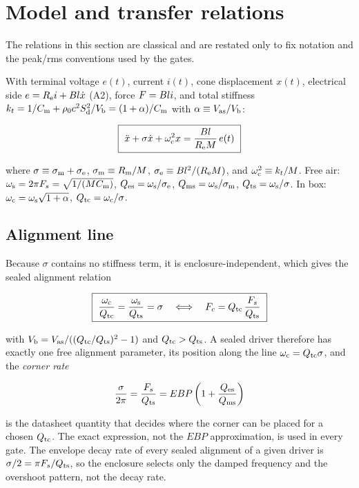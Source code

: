 \section{Model and transfer relations}
\label{sec:model}

The relations in this section are classical
\cite{small1972,small1972direct} and are restated only to fix notation and
the peak/rms conventions used by the gates.

With terminal voltage $e(t)$, current $i(t)$, cone displacement $x(t)$,
electrical side $e=R_{\mathrm{e}} i+Bl\dot x$ (A2), force $F=Bl i$, and total
stiffness $k_t=1/C_{\mathrm{m}}+\rho_0c^2S_{\mathrm{d}}^2/V_{\mathrm{b}}=(1+\alpha)/C_{\mathrm{m}}$ with
$\alpha\equiv V_{\mathrm{as}}/V_{\mathrm{b}}$:

\begin{equation}
	\boxed{\
		\ddot{x}+\sigma\dot{x}+\omega_{\mathrm{c}}^2 x = \frac{Bl}{R_{\mathrm{e}} M}\,e(t)\ }
	\label{eq:ode}
\end{equation}

where $\sigma\equiv\sigma_{\mathrm{m}}+\sigma_{\mathrm{e}}$, $\sigma_{\mathrm{m}}\equiv R_{\mathrm{m}}/M$,
$\sigma_{\mathrm{e}}\equiv Bl^2/(R_{\mathrm{e}}M)$, and $\omega_{\mathrm{c}}^2\equiv k_t/M$. Free air:
$\omega_{\mathrm{s}}=2\pi F_s=\sqrt{1/(MC_{\mathrm{m}})}$, $Q_{\mathrm{es}}=\omega_{\mathrm{s}}/\sigma_{\mathrm{e}}$, $Q_{\mathrm{ms}}=\omega_{\mathrm{s}}/\sigma_{\mathrm{m}}$,
$Q_{\mathrm{ts}}=\omega_{\mathrm{s}}/\sigma$. In box: $\omega_{\mathrm{c}}=\omega_{\mathrm{s}}\sqrt{1+\alpha}$, $Q_{\mathrm{tc}}=\omega_{\mathrm{c}}/\sigma$.

\subsection{Alignment line}
\label{sec:model-alignment}

Because $\sigma$ contains no stiffness term, it is enclosure-independent,
which gives the sealed alignment relation \cite{small1972}

\begin{equation}
	\boxed{\
		\frac{\omega_{\mathrm{c}}}{Q_{\mathrm{tc}}} = \frac{\omega_{\mathrm{s}}}{Q_{\mathrm{ts}}} = \sigma
			\quad\Longleftrightarrow\quad
		F_c = Q_{\mathrm{tc}}\,\frac{F_s}{Q_{\mathrm{ts}}}\ }
	\label{eq:alignment}
\end{equation}

with $V_{\mathrm{b}}=V_{\mathrm{as}}/((Q_{\mathrm{tc}}/Q_{\mathrm{ts}})^2-1)$ and $Q_{\mathrm{tc}}>Q_{\mathrm{ts}}$. A sealed driver
therefore has exactly one free alignment parameter, its position along the
line $\omega_{\mathrm{c}}=Q_{\mathrm{tc}}\sigma$, and the \emph{corner rate}

\begin{equation}
	\frac{\sigma}{2\pi}=\frac{F_s}{Q_{\mathrm{ts}}}
		=EBP\left(1+\frac{Q_{\mathrm{es}}}{Q_{\mathrm{ms}}}\right)
	\label{eq:cornerrate}
\end{equation}

is the datasheet quantity that decides where the corner can be placed for a
chosen $Q_{\mathrm{tc}}$. The exact expression, not the $EBP$ approximation, is used
in every gate. The envelope decay rate of every sealed alignment of a given
driver is $\sigma/2=\pi F_s/Q_{\mathrm{ts}}$, so the enclosure selects only the damped
frequency and the overshoot pattern, not the decay rate.

